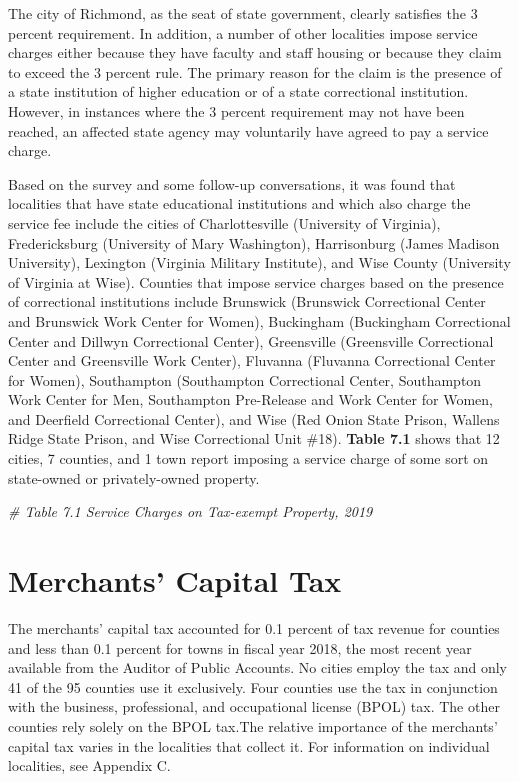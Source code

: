 \documentclass[
]{book}
\newenvironment{Shaded}{\begin{snugshade}}{\end{snugshade}}
\newcommand{\CommentTok}[1]{\textcolor[rgb]{0.56,0.35,0.01}{\textit{#1}}}
\begin{document}
The city of Richmond, as the seat of state government, clearly satisfies the 3 percent requirement. In addition, a number of other localities impose service charges either because they have faculty and staff housing or because they claim to exceed the 3 percent rule. The primary reason for the claim is the presence of a state institution of higher education or of a state correctional institution. However, in instances where the 3 percent requirement may not have been reached, an affected state agency may voluntarily have agreed to pay a service charge.

Based on the survey and some follow-up conversations, it was found that localities that have state educational institutions and which also charge the service fee include the cities of Charlottesville (University of Virginia), Fredericksburg (University of Mary Washington), Harrisonburg (James Madison University), Lexington (Virginia Military Institute), and Wise County (University of Virginia at Wise). Counties that impose service charges based on the presence of correctional institutions include Brunswick (Brunswick Correctional Center and Brunswick Work Center for Women), Buckingham (Buckingham Correctional Center and Dillwyn Correctional Center), Greensville (Greensville Correctional Center and Greensville Work Center), Fluvanna (Fluvanna Correctional Center for Women), Southampton (Southampton Correctional Center, Southampton Work Center for Men, Southampton Pre-Release and Work Center for Women, and Deerfield Correctional Center), and Wise (Red Onion State Prison, Wallens Ridge State Prison, and Wise Correctional Unit \#18). \textbf{Table 7.1} shows that 12 cities, 7 counties, and 1 town report imposing a service charge of some sort on state-owned or privately-owned property.

\begin{Shaded}
\begin{Highlighting}[]
\CommentTok{\# Table 7.1 Service Charges on Tax{-}exempt Property, 2019}
\end{Highlighting}
\end{Shaded}

\hypertarget{merchants-capital-tax}{%
\chapter{Merchants' Capital Tax}\label{merchants-capital-tax}}

The merchants' capital tax accounted for 0.1 percent of tax revenue for counties and less than 0.1 percent for towns in fiscal year 2018, the most recent year available from the Auditor of Public Accounts. No cities employ the tax and only 41 of the 95 counties use it exclusively. Four counties use the tax in conjunction with the business, professional, and occupational license (BPOL) tax. The other counties rely solely on the BPOL tax.The relative importance of the merchants' capital tax varies in the localities that collect it. For information on individual localities, see Appendix C.
\end{document}
